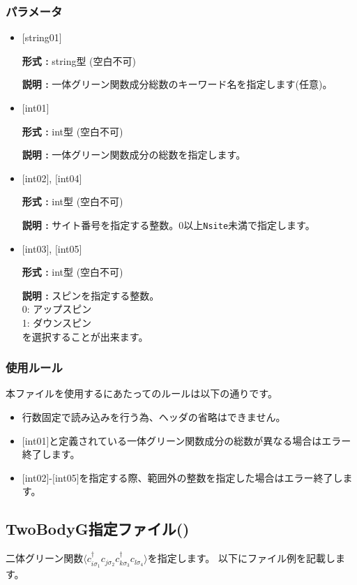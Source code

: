 \subsubsection{パラメータ}
 \begin{itemize}

   \item  $[$string01$]$
   
    {\bf 形式 :} string型 (空白不可)

   {\bf 説明 :} 一体グリーン関数成分総数のキーワード名を指定します(任意)。

   \item  $[$int01$]$
   
    {\bf 形式 :} int型 (空白不可)

   {\bf 説明 :} 一体グリーン関数成分の総数を指定します。

  \item  $[$int02$]$, $[$int04$]$

 {\bf 形式 :} int型 (空白不可)

{\bf 説明 :} サイト番号を指定する整数。0以上\verb|Nsite|{未満}で指定します。
 
  \item  $[$int03$]$, $[$int05$]$

 {\bf 形式 :} int型 (空白不可)

{\bf 説明 :} スピンを指定する整数。\\
0: アップスピン\\
1: ダウンスピン\\
を選択することが出来ます。

\end{itemize}

\subsubsection{使用ルール}
本ファイルを使用するにあたってのルールは以下の通りです。
\begin{itemize}
\item 行数固定で読み込みを行う為、ヘッダの省略はできません。
\item $[$int01$]$と定義されている一体グリーン関数成分の総数が異なる場合はエラー終了します。
\item $[$int02$]$-$[$int05$]$を指定する際、範囲外の整数を指定した場合はエラー終了します。
\end{itemize}

\newpage
\subsection{TwoBodyG指定ファイル()}
\label{Subsec:twobodyg}
二体グリーン関数$\langle c_{i\sigma_1}^{\dagger}c_{j\sigma_2}c_{k\sigma_3}^{\dagger}c_{l\sigma_4}\rangle$を指定します。
以下にファイル例を記載します。

